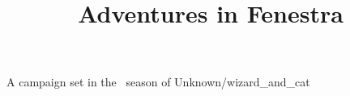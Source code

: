 \documentclass[a4paper,openany]{book}
\title{Adventures in Fenestra}
\begin{document}
\frontmatter


%
  {A campaign set in the \seasonDesc\ season of \season}%
  {Unknown/wizard_and_cat}

\tableofcontents



\mainmatter











\label{lastpage}

\startappendix









\backmatter

\printglossary[
  type=symbols,
  nonumberlist,
]

\printglossary

\printindex
\end{document}
